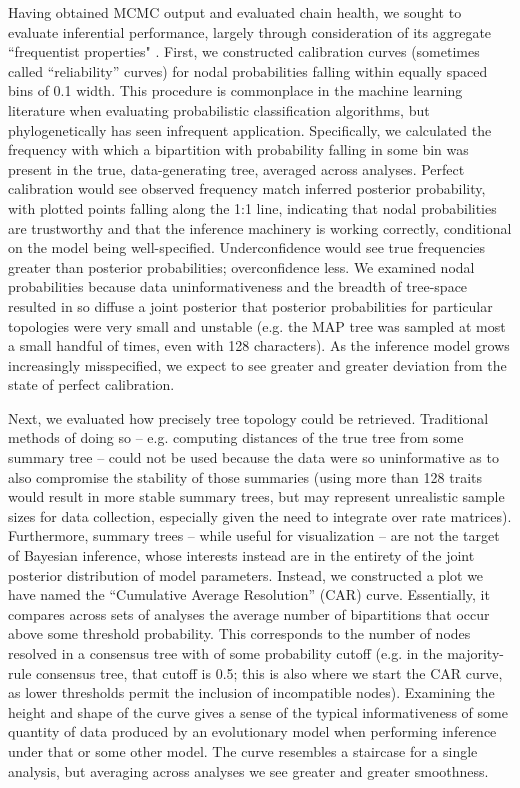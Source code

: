 Having obtained MCMC output and evaluated chain health, we sought to evaluate inferential performance, largely through consideration of its aggregate ``frequentist properties" \citep[\textit{sensu}][]{huelsenbeckFrequentistPropertiesBayesian2004}. First, we constructed calibration curves (sometimes called “reliability” curves) for nodal probabilities falling within equally spaced bins of 0.1 width. This procedure is commonplace in the machine learning literature when evaluating probabilistic classification algorithms, but phylogenetically has seen infrequent application. Specifically, we calculated the frequency with which a bipartition with probability falling in some bin was present in the true, data-generating tree, averaged across analyses. Perfect calibration would see observed frequency match inferred posterior probability, with plotted points falling along the 1:1 line, indicating that nodal probabilities are trustworthy and that the inference machinery is working correctly, conditional on the model being well-specified. Underconfidence would see true frequencies greater than posterior probabilities; overconfidence less. We examined nodal probabilities because data uninformativeness and the breadth of tree-space resulted in so diffuse a joint posterior that posterior probabilities for particular topologies were very small and unstable (e.g. the MAP tree was sampled at most a small handful of times, even with 128 characters). As the inference model grows increasingly misspecified, we expect to see greater and greater deviation from the state of perfect calibration.

Next, we evaluated how precisely tree topology could be retrieved. Traditional methods of doing so – e.g. computing distances of the true tree from some summary tree – could not be used because the data were so uninformative as to also compromise the stability of those summaries (using more than 128 traits would result in more stable summary trees, but may represent unrealistic sample sizes for data collection, especially given the need to integrate over rate matrices). Furthermore, summary trees – while useful for visualization – are not the target of Bayesian inference, whose interests instead are in the entirety of the joint posterior distribution of model parameters. Instead, we constructed a plot we have named the “Cumulative Average Resolution” (CAR) curve. Essentially, it compares across sets of analyses the average number of bipartitions that occur above some threshold probability. This corresponds to the number of nodes resolved in a consensus tree with of some probability cutoff (e.g. in the majority-rule consensus tree, that cutoff is 0.5; this is also where we start the CAR curve, as lower thresholds permit the inclusion of incompatible nodes). Examining the height and shape of the curve gives a sense of the typical informativeness of some quantity of data produced by an evolutionary model when performing inference under that or some other model. The curve resembles a staircase for a single analysis, but averaging across analyses we see greater and greater smoothness.



